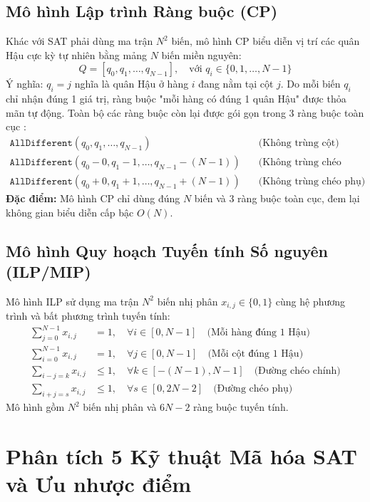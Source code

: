 \documentclass[a4paper,11pt]{article}
\begin{document}
\subsection{Mô hình Lập trình Ràng buộc (CP)}
Khác với SAT phải dùng ma trận $N^2$ biến, mô hình CP biểu diễn vị trí các quân Hậu cực kỳ tự nhiên bằng mảng $N$ biến miền nguyên:
\begin{equation}
    Q = [q_0, q_1, \dots, q_{N-1}], \quad \text{với } q_i \in \{0, 1, \dots, N-1\}
\end{equation}
Ý nghĩa: $q_i = j$ nghĩa là quân Hậu ở hàng $i$ đang nằm tại cột $j$.
Do mỗi biến $q_i$ chỉ nhận đúng 1 giá trị, ràng buộc "mỗi hàng có đúng 1 quân Hậu" được thỏa mãn tự động. Toàn bộ các ràng buộc còn lại được gói gọn trong 3 ràng buộc toàn cục \cite{regin1994}:
\begin{align}
    \texttt{AllDifferent}(q_0, q_1, \dots, q_{N-1}) & \quad \text{(Không trùng cột)} \\
    \texttt{AllDifferent}(q_0 - 0, q_1 - 1, \dots, q_{N-1} - (N-1)) & \quad \text{(Không trùng chéo chính)} \\
    \texttt{AllDifferent}(q_0 + 0, q_1 + 1, \dots, q_{N-1} + (N-1)) & \quad \text{(Không trùng chéo phụ)}
\end{align}
\textbf{Đặc điểm:} Mô hình CP chỉ dùng đúng $N$ biến và 3 ràng buộc toàn cục, đem lại không gian biểu diễn cấp bậc $O(N)$.

\subsection{Mô hình Quy hoạch Tuyến tính Số nguyên (ILP/MIP)}
Mô hình ILP sử dụng ma trận $N^2$ biến nhị phân $x_{i,j} \in \{0, 1\}$ cùng hệ phương trình và bất phương trình tuyến tính:
\begin{align}
    \sum_{j=0}^{N-1} x_{i,j} &= 1, \quad \forall i \in [0, N-1] \quad \text{(Mỗi hàng đúng 1 Hậu)} \\
    \sum_{i=0}^{N-1} x_{i,j} &= 1, \quad \forall j \in [0, N-1] \quad \text{(Mỗi cột đúng 1 Hậu)} \\
    \sum_{i-j=k} x_{i,j} &\le 1, \quad \forall k \in [-(N-1), N-1] \quad \text{(Đường chéo chính)} \\
    \sum_{i+j=s} x_{i,j} &\le 1, \quad \forall s \in [0, 2N-2] \quad \text{(Đường chéo phụ)}
\end{align}
Mô hình gồm $N^2$ biến nhị phân và $6N - 2$ ràng buộc tuyến tính.

\section{Phân tích 5 Kỹ thuật Mã hóa SAT và Ưu nhược điểm}
\end{document}
